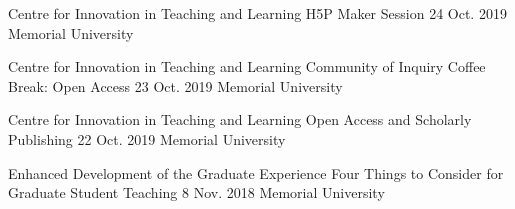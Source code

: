 \begin{cventries}
  \cventry
    {Centre for Innovation in Teaching and Learning} %
    {H5P Maker Session} %
    {24 Oct. 2019} %
    {Memorial University} %
    {
    }

  \cventry
    {Centre for Innovation in Teaching and Learning} %
    {Community of Inquiry Coffee Break: Open Access} %
    {23 Oct. 2019} %
    {Memorial University} %
    {
    }

  \cventry
    {Centre for Innovation in Teaching and Learning} %
    {Open Access and Scholarly Publishing} %
    {22 Oct. 2019} %
    {Memorial University} %
    {
    }

  \cventry
    {Enhanced Development of the Graduate Experience} %
    {Four Things to Consider for Graduate Student Teaching} %
    {8 Nov. 2018} %
    {Memorial University} %
    {
    }


\end{cventries}
